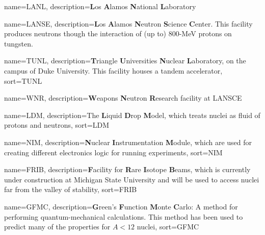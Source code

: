 {
  name=LANL,
  description={\textbf{L}os \textbf{A}lamos \textbf{N}ational \textbf{L}aboratory}
 }

{
  name=LANSE,
  description={\textbf{L}os \textbf{A}lamos \textbf{N}eutron \textbf{S}cience \textbf{C}enter. This facility produces neutrons though the interaction of (up to) 800-MeV protons on tungsten. }
 }

 
{
  name=TUNL,
  description={\textbf{T}riangle \textbf{U}niversities \textbf{N}uclear \textbf{L}aboratory, on the campus of Duke University. This facility houses a tandem accelerator},
  sort={TUNL}
 }

{
  name=WNR,
  description={\textbf{W}eapons \textbf{N}eutron \textbf{R}esearch facility at LANSCE}
 }

{
  name=LDM,
  description={The \textbf{L}iquid \textbf{D}rop \textbf{M}odel, which treats nuclei as fluid of protons and neutrons},
  sort={LDM}
 }

{
  name=NIM,
  description={\textbf{N}uclear \textbf{I}nstrumentation \textbf{M}odule, which are used for creating different electronics logic for running experiments},
  sort={NIM}
 }

{
  name=FRIB,
  description={\textbf{F}acility for \textbf{R}are \textbf{I}sotope \textbf{B}eams, which is currently under construction at Michigan State University and will be used to access nuclei far from the valley of stability},
  sort={FRIB}
 }

{
  name=GFMC,
  description={\textbf{G}reen's \textbf{F}unction \textbf{M}onte \textbf{C}arlo: A method for performing quantum-mechanical calculations. This method has been used to predict many of the properties for $A < 12$ nuclei},
  sort={GFMC}
}
